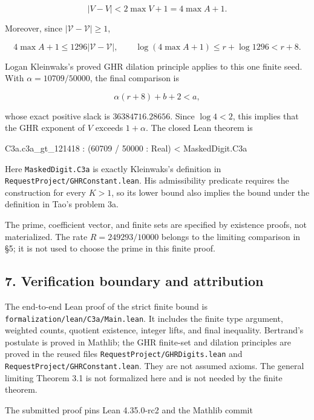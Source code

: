 \documentclass[
  10pt,
]{article}
\newenvironment{Shaded}{}{}
\newcommand{\NormalTok}[1]{#1}
\begin{document}
\[
|V-V|<2\max V+1=4\max A+1.
\]

Moreover, since \(|\mathcal V-\mathcal V|\ge1\),

\[
4\max A+1\le1296|\mathcal V-\mathcal V|,
\qquad
\log(4\max A+1)\le r+\log1296<r+8.
\]

Logan Kleinwaks's proved GHR dilation principle applies to this one
finite seed. With \(\alpha=10709/50000\), the final comparison is

\[
\alpha(r+8)+b+2<a,
\tag{6.1}
\]

whose exact positive slack is \(36384716.28656\). Since \(\log4<2\),
this implies that the GHR exponent of \(V\) exceeds \(1+\alpha\). The
closed Lean theorem is

\begin{Shaded}
\begin{Highlighting}[]
\NormalTok{C3a.c3a\_gt\_121418 : (60709 / 50000 : Real) \textless{} MaskedDigit.C3a}
\end{Highlighting}
\end{Shaded}

Here \texttt{MaskedDigit.C3a} is exactly Kleinwaks's definition in
\texttt{RequestProject/GHRConstant.lean}. His admissibility predicate
requires the construction for every \(K>1\), so its lower bound also
implies the bound under the definition in Tao's problem 3a.

The prime, coefficient vector, and finite sets are specified by
existence proofs, not materialized. The rate \(R=249293/10000\) belongs
to the limiting comparison in §5; it is not used to choose the prime in
this finite proof.

\subsection{7. Verification boundary and
attribution}\label{verification-boundary-and-attribution}

The end-to-end Lean proof of the strict finite bound is
\texttt{formalization/lean/C3a/Main.lean}. It includes the finite type
argument, weighted counts, quotient existence, integer lifts, and final
inequality. Bertrand's postulate is proved in Mathlib; the GHR
finite-set and dilation principles are proved in the reused files
\texttt{RequestProject/GHRDigits.lean} and
\texttt{RequestProject/GHRConstant.lean}. They are not assumed axioms.
The general limiting Theorem 3.1 is not formalized here and is not
needed by the finite theorem.

The submitted proof pins Lean 4.35.0-rc2 and the Mathlib commit
\end{document}
